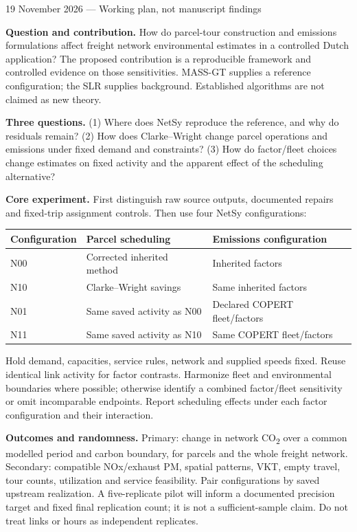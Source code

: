 \par
{}\par
\noindent\small 19 November 2026 --- Working plan, not manuscript findings\par
\medskip

\noindent\textbf{Question and contribution.}
How do parcel-tour construction and emissions formulations affect freight
network environmental estimates in a controlled Dutch application?
The proposed contribution is a reproducible framework and controlled evidence
on those sensitivities. MASS-GT supplies a reference configuration; the SLR
supplies background. Established algorithms are not claimed as new theory.

\smallskip
\noindent\textbf{Three questions.}
(1) Where does NetSy reproduce the reference, and why do residuals remain?
(2) How does Clarke--Wright change parcel operations and emissions under fixed
demand and constraints? (3) How do factor/fleet choices change estimates on
fixed activity and the apparent effect of the scheduling alternative?

\smallskip
\noindent\textbf{Core experiment.}
First distinguish raw source outputs, documented repairs and fixed-trip
assignment controls. Then use four NetSy configurations:
\begin{center}\small
\begin{tabular}{@{}lll@{}}
\toprule Configuration & Parcel scheduling & Emissions configuration \\
\midrule
N00 & Corrected inherited method & Inherited factors \\
N10 & Clarke--Wright savings & Same inherited factors \\
N01 & Same saved activity as N00 & Declared COPERT fleet/factors \\
N11 & Same saved activity as N10 & Same COPERT fleet/factors \\
\bottomrule
\end{tabular}
\end{center}
Hold demand, capacities, service rules, network and supplied speeds fixed.
Reuse identical link activity for factor contrasts. Harmonize fleet and
environmental boundaries where possible; otherwise identify a combined
factor/fleet sensitivity or omit incomparable endpoints. Report scheduling
effects under each factor configuration and their interaction.

\smallskip
\noindent\textbf{Outcomes and randomness.}
Primary: change in network CO\textsubscript{2} over a common modelled period and
carbon boundary, for parcels and the whole freight network. Secondary:
compatible NOx/exhaust PM, spatial patterns, VKT, empty travel, tour counts,
utilization and service feasibility. Pair configurations by saved upstream
realization. A five-replicate pilot will inform a documented precision target
and fixed final replication count; it is not a sufficient-sample claim.
Do not treat links or hours as independent replicates.

